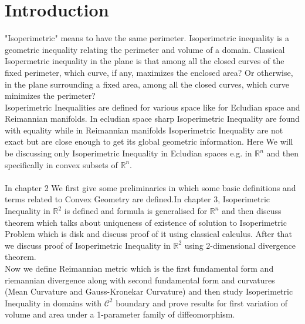 \documentclass[oneside]{book}
\begin{document}
	
	
	
	
	
	
	
	
	
	
	
	
	
	
	
	
	
	
	
	
	
	
	
	
	
	
	
	
	
	
	
	
	
	
	
	
	\chapter{Introduction}
	\label{chap:c1}
	
	"Isoperimetric" means to have the same perimeter. Isoperimetric  inequality is a geometric inequality relating  the perimeter and volume of a domain. Classical Isopermetric inequality in the plane is that among all the closed curves of the fixed perimeter, which curve, if any, maximizes the enclosed area? Or otherwise, in the plane surrounding a fixed area, among all the closed curves, which curve minimizes the perimeter? \\
	
	Isoperimetric Inequalities are defined for various space like for Ecludian space and Reimannian manifolds. In ecludian space sharp Isoperimetric Inequality are found with equality while in Reimannian manifolds Isoperimetric Inequality are not exact but are close enough to get its global geometric information. Here We will be discussing only  Isoperimetric Inequality in Ecludian spaces e.g. in  $\mathbb{R}^{n}$ and then specifically in convex subsets of $\mathbb{R}^{n}$.
	\\
	\\
	In chapter 2 We first give some preliminaries in which some basic definitions and terms related to Convex Geometry are defined.In chapter 3, Isoperimetric Inequality in $\mathbb{R}^2$ is defined and formula is generalised for $\mathbb{R}^n$ and then discuss theorem which talks about uniqueness of existence of solution to Isoperimetric Problem which is disk and discuss proof of it using classical calculus. After that we discuss proof of Isoperimetric Inequality in $\mathbb{R}^2$  using 2-dimensional divergence theorem. \\
	Now we define Reimannian metric which is the first fundamental form and  riemannian divergence  along with second fundamental form and curvatures (Mean Curvature and Gauss-Kronekar Curvature) and then study Isoperimetric Inequality in domains with $\mathcal{C}^2 $ boundary and prove  results for first variation  of volume and area under a 1-parameter family of diffeomorphism.
	
\end{document}
